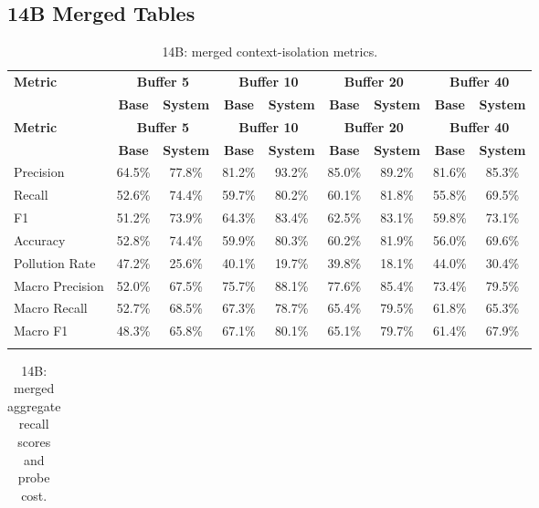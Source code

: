 \begin{landscape}
\subsection{14B Merged Tables}\label{app:14b_merged}
\tiny
\begin{longtable}{@{}p{3.8cm}cccccccc@{}}
\caption{14B: merged context-isolation metrics.}\label{tab:app_14b_context}\\

\toprule
\textbf{Metric} & \multicolumn{2}{c}{\textbf{Buffer 5}} & \multicolumn{2}{c}{\textbf{Buffer 10}} & \multicolumn{2}{c}{\textbf{Buffer 20}} & \multicolumn{2}{c}{\textbf{Buffer 40}} \\
\cmidrule(lr){2-3}\cmidrule(lr){4-5}\cmidrule(lr){6-7}\cmidrule(lr){8-9}
 & \textbf{Base} & \textbf{System} & \textbf{Base} & \textbf{System} & \textbf{Base} & \textbf{System} & \textbf{Base} & \textbf{System} \\
\midrule
\endfirsthead

\toprule
\textbf{Metric} & \multicolumn{2}{c}{\textbf{Buffer 5}} & \multicolumn{2}{c}{\textbf{Buffer 10}} & \multicolumn{2}{c}{\textbf{Buffer 20}} & \multicolumn{2}{c}{\textbf{Buffer 40}} \\
\cmidrule(lr){2-3}\cmidrule(lr){4-5}\cmidrule(lr){6-7}\cmidrule(lr){8-9}
 & \textbf{Base} & \textbf{System} & \textbf{Base} & \textbf{System} & \textbf{Base} & \textbf{System} & \textbf{Base} & \textbf{System} \\
\midrule
\endhead
Precision & 64.5\% & 77.8\% & 81.2\% & 93.2\% & 85.0\% & 89.2\% & 81.6\% & 85.3\% \\
Recall & 52.6\% & 74.4\% & 59.7\% & 80.2\% & 60.1\% & 81.8\% & 55.8\% & 69.5\% \\
F1 & 51.2\% & 73.9\% & 64.3\% & 83.4\% & 62.5\% & 83.1\% & 59.8\% & 73.1\% \\
Accuracy & 52.8\% & 74.4\% & 59.9\% & 80.3\% & 60.2\% & 81.9\% & 56.0\% & 69.6\% \\
Pollution Rate & 47.2\% & 25.6\% & 40.1\% & 19.7\% & 39.8\% & 18.1\% & 44.0\% & 30.4\% \\
Macro Precision & 52.0\% & 67.5\% & 75.7\% & 88.1\% & 77.6\% & 85.4\% & 73.4\% & 79.5\% \\
Macro Recall & 52.7\% & 68.5\% & 67.3\% & 78.7\% & 65.4\% & 79.5\% & 61.8\% & 65.3\% \\
Macro F1 & 48.3\% & 65.8\% & 67.1\% & 80.1\% & 65.1\% & 79.7\% & 61.4\% & 67.9\% \\
\botrule
\end{longtable}
\begin{longtable}{@{}p{3.8cm}cccccccc@{}}
\caption{14B: merged aggregate recall scores and probe cost.}\label{tab:app_14b_recall_agg}\\


\end{longtable}
\end{landscape}
